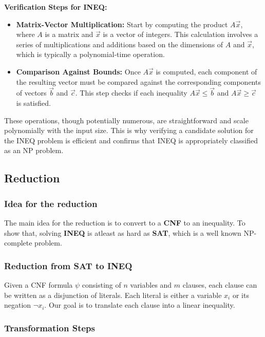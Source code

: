 \documentclass{article}
\begin{document}
\textbf{Verification Steps for INEQ:}
\begin{itemize}
    \item \textbf{Matrix-Vector Multiplication:} Start by computing the product \(A\vec{x}\), where \(A\) is a matrix and \(\vec{x}\) is a vector of integers. This calculation involves a series of multiplications and additions based on the dimensions of \(A\) and \(\vec{x}\), which is typically a polynomial-time operation.
    \item \textbf{Comparison Against Bounds:} Once \(A\vec{x}\) is computed, each component of the resulting vector must be compared against the corresponding components of vectors \(\vec{b}\) and \(\vec{c}\). This step checks if each inequality \(A\vec{x} \leq \vec{b}\) and \(A\vec{x} \geq \vec{c}\) is satisfied.
\end{itemize}

These operations, though potentially numerous, are straightforward and scale polynomially with the input size. This is why verifying a candidate solution for the INEQ problem is efficient and confirms that INEQ is appropriately classified as an NP problem.

\subsection*{Reduction}
\subsubsection*{Idea for the reduction}
The main idea for the reduction is to convert to a \textbf{CNF} to an inequality. To show that, solving \textbf{INEQ} is atleast as hard as \textbf{SAT}, which is a well known NP-complete problem.
\subsubsection*{Reduction from SAT to INEQ}

Given a CNF formula $\psi$ consisting of $n$ variables and $m$ clauses, each clause can be written as a disjunction of literals. Each literal is either a variable $x_i$ or its negation $\neg x_i$. Our goal is to translate each clause into a linear inequality.

\subsubsection*{Transformation Steps}
\end{document}
